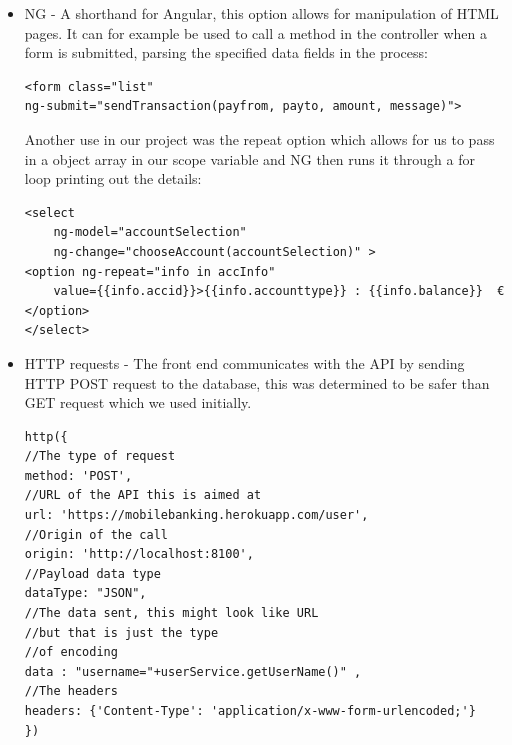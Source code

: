 \begin{itemize}
        \item NG - A shorthand for Angular, this option allows for manipulation of HTML pages.
        It can for example be used to call a method in the controller when a form is submitted,
        parsing the specified data fields in the process:
\begin{verbatim}
<form class="list"
ng-submit="sendTransaction(payfrom, payto, amount, message)">
\end{verbatim}
        Another use in our project was the repeat option which allows for us to pass in a object array in our scope variable and NG then runs it through a for loop printing out the details:
\begin{verbatim}
<select
    ng-model="accountSelection"
    ng-change="chooseAccount(accountSelection)" >
<option ng-repeat="info in accInfo"
    value={{info.accid}}>{{info.accounttype}} : {{info.balance}}  €
</option>
</select>
\end{verbatim}
    \item HTTP requests - The front end communicates with the API by sending HTTP POST request to the database, this was determined to be safer than GET request which we used initially.
\begin{verbatim}
http({
//The type of request
method: 'POST',
//URL of the API this is aimed at
url: 'https://mobilebanking.herokuapp.com/user',
//Origin of the call
origin: 'http://localhost:8100',
//Payload data type
dataType: "JSON",
//The data sent, this might look like URL
//but that is just the type
//of encoding
data : "username="+userService.getUserName()" ,
//The headers
headers: {'Content-Type': 'application/x-www-form-urlencoded;'}
})
\end{verbatim}
\end{itemize}


